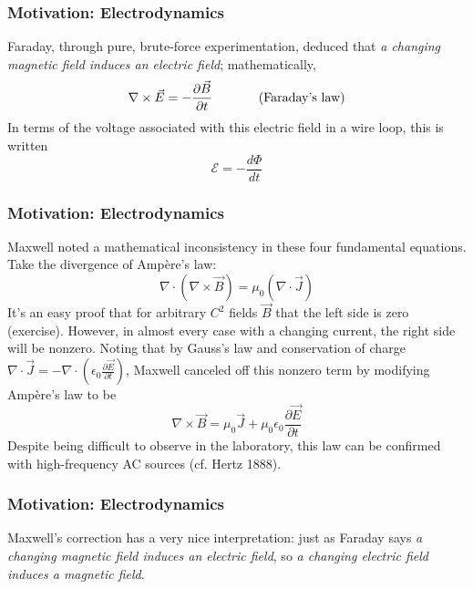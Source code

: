 \documentclass[10pt]{beamer}
\begin{document}
\begin{frame}
  \frametitle{Motivation: Electrodynamics}
  Faraday, through pure, brute-force experimentation, deduced that \textit{a changing magnetic field induces an electric field}; mathematically,
  \[
    \nabla\times\vec{E}=-\frac{\partial\vec{B}}{\partial t} \hspace{0.5in}\textrm{(Faraday's law)}
  \]
  In terms of the voltage associated with this electric field in a wire loop, this is written
  \[
    \mathcal{E}=-\frac{d\Phi}{d t}
  \]
\end{frame}

\begin{frame}
  \frametitle{Motivation: Electrodynamics}
  Maxwell noted a mathematical inconsistency in these four fundamental equations. Take the divergence of Amp\`ere's law:
  \[
    \nabla\cdot(\nabla\times \vec{B})=\mu_{0}(\nabla\cdot\vec{J})
  \]
  It's an easy proof that for arbitrary $C^{2}$ fields $\vec{B}$ that the left side is zero (exercise). However, in almost every case with a changing current, the right side will be nonzero.
  Noting that by Gauss's law and conservation of charge $\nabla\cdot \vec{J}=-\nabla\cdot\left( \epsilon_{0}\frac{\partial\vec{E}}{\partial t} \right)$, Maxwell canceled off this nonzero term by modifying Amp\`ere's law to be
  \[
    \nabla\times\vec{B}=\mu_{0}\vec{J}+\mu_{0}\epsilon_{0}\frac{\partial \vec{E}}{\partial t}
  \]
  Despite being difficult to observe in the laboratory, this law can be confirmed with high-frequency AC sources (cf. Hertz 1888).
\end{frame}

\begin{frame}
  \frametitle{Motivation: Electrodynamics}
  Maxwell's correction has a very nice interpretation: just as Faraday says \textit{a changing magnetic field induces an electric field}, so \textit{a changing electric field induces a magnetic field}.

\end{frame}
\end{document}
